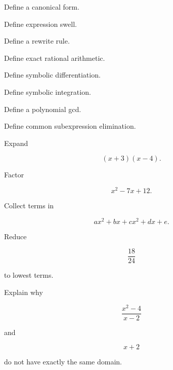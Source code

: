 \begin{exercise}[1]
Define a canonical form.
\end{exercise}

\begin{exercise}[1]
Define expression swell.
\end{exercise}

\begin{exercise}[1]
Define a rewrite rule.
\end{exercise}

\begin{exercise}[1]
Define exact rational arithmetic.
\end{exercise}

\begin{exercise}[1]
Define symbolic differentiation.
\end{exercise}

\begin{exercise}[1]
Define symbolic integration.
\end{exercise}

\begin{exercise}[1]
Define a polynomial gcd.
\end{exercise}

\begin{exercise}[1]
Define common subexpression elimination.
\end{exercise}

\begin{exercise}[2]
Expand

\[
(x+3)(x-4).
\]
\end{exercise}

\begin{exercise}[2]
Factor

\[
x^2-7x+12.
\]
\end{exercise}

\begin{exercise}[2]
Collect terms in

\[
ax^2+bx+cx^2+dx+e.
\]
\end{exercise}

\begin{exercise}[2]
Reduce

\[
\frac{18}{24}
\]

to lowest terms.
\end{exercise}

\begin{exercise}[3]
Explain why

\[
\frac{x^2-4}{x-2}
\]

and

\[
x+2
\]

do not have exactly the same domain.
\end{exercise}

